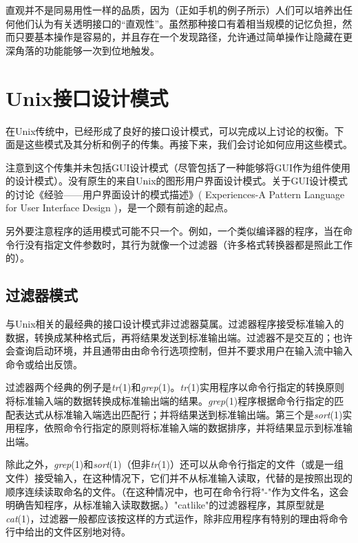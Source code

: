 \documentclass[12pt,oneside]{book}
\begin{document}
\begin{common-format}
直观并不是同易用性一样的品质，因为（正如手机的例子所示）人们可以培养出任何他们认为有关透明接口的“直观性”。虽然那种接口有着相当规模的记忆负担，然而只要基本操作是容易的，并且存在一个发现路径，允许通过简单操作让隐藏在更深角落的功能能够一次到位地触发。

\section{Unix接口设计模式}
在Unix传统中，已经形成了良好的接口设计模式，可以完成以上讨论的权衡。下面是这些模式及其分析和例子的传集。再接下来，我们会讨论如何应用这些模式。

注意到这个传集并未包括GUI设计模式（尽管包括了一种能够将GUI作为组件使用的设计模式）。没有原生的来自Unix的图形用户界面设计模式。关于GUI设计模式的讨论《经验——用户界面设计的模式描述》( Experiences-A Pattern Language for User Interface Design )\cite{Coram-Lee}，是一个颇有前途的起点。

另外要注意程序的适用模式可能不只一个。例如，一个类似编译器的程序，当在命令行没有指定文件参数时，其行为就像一个过滤器（许多格式转换器都是照此工作的）。

\subsection{过滤器模式}
与Unix相关的最经典的接口设计模式非过滤器莫属。过滤器程序接受标准输入的数据，转换成某种格式后，再将结果发送到标准输出端。过滤器不是交互的；也许会查询启动环境，并且通带由由命令行选项控制，但并不要求用户在输入流中输入命令或给出反馈。

过滤器两个经典的例子是\textit{tr}(1)和\textit{grep}(1)。\textit{tr}(1)实用程序以命令行指定的转换原则将标准输入端的数据转换成标准输出端的结果。\textit{grep}(1)程序根据命令行指定的匹配表达式从标准输入端选出匹配行；并将结果送到标准输出端。第三个是\textit{sort}(1)实用程序，依照命令行指定的原则将标准输入端的数据排序，并将结果显示到标准输出端。

除此之外，\textit{grep}(1)和\textit{sort}(1)（但非\textit{tr}(1)）还可以从命令行指定的文件（或是一组文件）接受输入，在这种情况下，它们并不从标准输入读取，代替的是按照出现的顺序连续读取命名的文件。（在这种情况中，也可在命令行将"-"作为文件名，这会明确告知程序，从标准输入读取数据。）"catlike"的过滤器程序，其原型就是\textit{cat}(1)，过滤器一般都应该按这样的方式运作，除非应用程序有特别的理由将命令行中给出的文件区别地对待。


\end{common-format}
\end{document}
